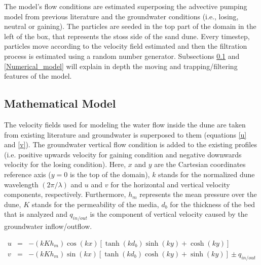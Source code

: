 \documentclass[draft,linenumbers]{agujournal2018}
\begin{document}
The model's flow conditions are estimated superposing the advective pumping model from previous literature and the groundwater conditions (i.e., losing, neutral or gaining). The particles are seeded in the top part of the domain in the left of the box, that represents the stoss side of the sand dune. Every timestep, particles move according to the velocity field estimated and then the filtration process is estimated using a random number generator. Subsections \ref{Mathematical_model} and \ref{Numerical_model} will explain in depth the moving and trapping/filtering features of the model.

\subsection{Mathematical Model} \label{Mathematical_model}

The velocity fields used for modeling the water flow inside the dune are taken from existing literature \citep{Elliott1997,Packman2000} and groundwater is superposed to them (equations \ref{u} and \ref{v}). The groundwater vertical flow condition is added to the existing profiles (i.e. positive upwards velocity for gaining condition and negative downwards velocity for the losing condition). Here, $x$ and $y$ are the Cartesian coordinates reference axis ($y = 0$ is the top of the domain), $k$ stands for the normalized dune wavelength $(2 \pi / \lambda)$ and $u$ and $v$ for the horizontal and vertical velocity components, respectively. Furthermore, $h_m$ represents the mean pressure over the dune, $K$ stands for the permeability of the media, $d_b$ for the thickness of the bed that is analyzed and $q_{in/out}$ is the component of vertical velocity caused by the groundwater inflow/outflow. 

\begin{eqnarray}
\label{u}
  u & = & -(kKh_{m}) \cos(kx) [\tanh(kd_b)\sinh(ky) + \cosh(ky)] \\
\label{v}
  v & = & -(kKh_{m}) \sin(kx) [\tanh(kd_b)\cosh(ky) + \sinh(ky)] \pm q_{in/out} 
\end{eqnarray}
\end{document}
